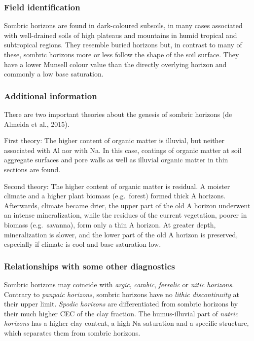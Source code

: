 \documentclass[
  letterpaper,
  DIV=11,
  numbers=noendperiod]{scrreprt}
\begin{document}
\hypertarget{field-identification-25}{%
\subsubsection{Field identification}\label{field-identification-25}}

Sombric horizons are found in dark-coloured subsoils, in many cases
associated with well-drained soils of high plateaus and mountains in
humid tropical and subtropical regions. They resemble buried horizons
but, in contrast to many of these, sombric horizons more or less follow
the shape of the soil surface. They have a lower Munsell colour value
than the directly overlying horizon and commonly a low base saturation.

\hypertarget{additional-information-19}{%
\subsubsection{Additional information}\label{additional-information-19}}

There are two important theories about the genesis of sombric horizons
(de Almeida et al., 2015).

First theory: The higher content of organic matter is illuvial, but
neither associated with Al nor with Na. In this case, coatings of
organic matter at soil aggregate surfaces and pore walls as well as
illuvial organic matter in thin sections are found.

Second theory: The higher content of organic matter is residual. A
moister climate and a higher plant biomass (e.g.~forest) formed thick A
horizons. Afterwards, climate became drier, the upper part of the old A
horizon underwent an intense mineralization, while the residues of the
current vegetation, poorer in biomass (e.g.~savanna), form only a thin A
horizon. At greater depth, mineralization is slower, and the lower part
of the old A horizon is preserved, especially if climate is cool and
base saturation low.

\hypertarget{relationships-with-some-other-diagnostics-32}{%
\subsubsection{Relationships with some other
diagnostics}\label{relationships-with-some-other-diagnostics-32}}

Sombric horizons may coincide with \emph{argic}, \emph{cambic},
\emph{ferralic} or \emph{nitic horizons}. Contrary to \emph{panpaic
horizons}, sombric horizons have no \emph{lithic discontinuity} at their
upper limit. \emph{Spodic horizons} are differentiated from sombric
horizons by their much higher CEC of the clay fraction. The
humus-illuvial part of \emph{natric horizons} has a higher clay content,
a high Na saturation and a specific structure, which separates them from
sombric horizons.
\end{document}
